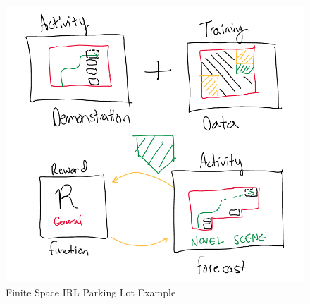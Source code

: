 \documentclass[11pt]{article}
\begin{document}
\begin{figure}[H]
\centering
\includegraphics[width=4.5in]{parking.png}
\caption{Finite Space IRL Parking Lot Example \cite{activityForecasting}} 
\label{img:irl_parking_lot}
\end{figure}


 





\end{document}

